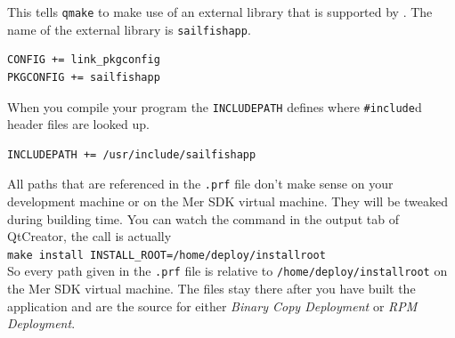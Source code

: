 This tells \verb,qmake, to make use of an external library that is supported by . The name of the external library is \verb,sailfishapp,.
%
\begin{lstlisting}[language=tex]
CONFIG += link_pkgconfig
PKGCONFIG += sailfishapp
\end{lstlisting}
%
When you compile your program the \verb,INCLUDEPATH, defines where \verb,#include,d header files are looked up.
%
\begin{lstlisting}[language=tex]
INCLUDEPATH += /usr/include/sailfishapp
\end{lstlisting}
%
All paths that are referenced in the \verb,.prf, file don't make sense on your development machine or on the Mer SDK virtual machine. They will be tweaked during building time. You can watch the command in the output tab of QtCreator, the call is actually\\
\verb,make install INSTALL_ROOT=/home/deploy/installroot,\\
So every path given in the \verb,.prf, file is relative to
\verb,/home/deploy/installroot, on the Mer SDK virtual machine. The files stay there after you have built the application and are the source for either \emph{Binary Copy Deployment} or \emph{RPM Deployment}.
%
%
